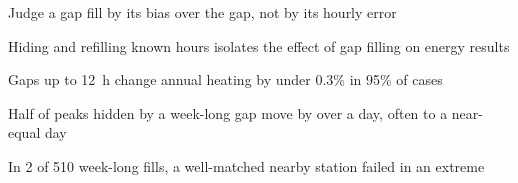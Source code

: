 \item Judge a gap fill by its bias over the gap, not by its hourly error
\item Hiding and refilling known hours isolates the effect of gap filling on energy results
\item Gaps up to 12~h change annual heating by under 0.3\% in 95\% of cases
\item Half of peaks hidden by a week-long gap move by over a day, often to a near-equal day
\item In 2 of 510 week-long fills, a well-matched nearby station failed in an extreme
